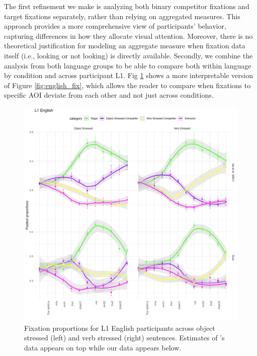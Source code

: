 The first refinement we make is analyzing both binary competitor fixations and target fixations separately, rather than relying on aggregated measures. This approach provides a more comprehensive view of participants’ behavior, capturing differences in how they allocate visual attention. Moreover, there is no theoretical justification for modeling an aggregate measure when fixation data itself (i.e., looking or not looking) is directly available. Secondly, we combine the analysis from both language groups to be able to compare both within language by condition and across participant L1. Fig \ref{fig:english_fix2} shows a more interpretable version of Figure \ref{fig:english_fix}, which allows the reader to compare when fixations to specific AOI deviate from each other and not just across conditions.

\begin{figure}[H]  %
    \centering
    \includegraphics[width=\textwidth,height=\textheight,keepaspectratio]{viz/english_fix2.png}
    \caption{Fixation proportions for L1 English participants across object stressed (left) and verb stressed (right) sentences. Estimates of \citep{Ge2021}'s data appears on top while our data appears below.}
    \label{fig:english_fix2}
\end{figure}

